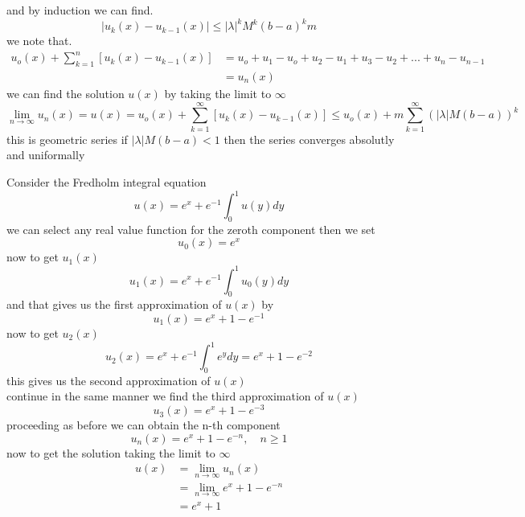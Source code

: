 \documentclass[]{article}
\begin{document}
and by induction we can find.
\[
    |u_{k}(x) - u_{k-1}(x)| \leq |\lambda|^kM^k {(b-a)}^k m    
\]
we note that.
\begin{align*}
u_o(x) + \sum_{k=1}^{n} [u_{k}(x) - u_{k-1}(x)] &= u_o + u_1 - u_o + u_2 - u_1 + u_3 - u_2 + ...+u_n - u_{n-1}
\\
&= u_n(x)
\end{align*}
we can find the solution $u(x)$ by taking the limit to $\infty$
\[
    \lim_{n\to\infty} u_n(x) = u(x) = u_o(x) + \sum_{k=1}^{\infty} [u_{k}(x) - u_{k-1}(x)] \leq u_o(x) + m\sum_{k=1}^{\infty} {(|\lambda|M(b-a))}^k    
\]
this is geometric series
if $|\lambda|M(b-a) < 1$ then the series converges absolutly and uniformally
\begin{example}
    Consider the Fredholm integral equation 
    \[
        u(x) = e^x + e^{-1}\int_{0}^{1}u(y)dy    
    \]
    we can select any real value function for the zeroth component then we set 
    \[
    u_0(x) = e^x 
    \]
    now to get $u_1(x)$
    \[
        u_1(x) = e^x + e^{-1}\int_{0}^{1}u_0(y)dy        
    \]
    and that gives us the first approximation of $u(x)$ by
    \[
        u_1(x) = e^x + 1 - e^{-1} 
    \]
    now to get $u_2(x)$
    \[
        u_2(x) = e^x + e^{-1}\int_{0}^{1}e^ydy = e^x + 1 - e^{-2}
    \]
    this gives us the second approximation of $u(x)$
    \\
    continue in the same manner we find the third approximation of $u(x)$
    \[
        u_3(x) = e^x + 1 - e^{-3}
    \]
    proceeding as before we can obtain the n-th component
    \[
        u_n(x) = e^x + 1 - e^{-n} , \quad n \geq 1
    \]
    now to get the solution taking the limit to $\infty$
    \begin{align*}
        u(x) &= \lim_{n\to\infty} u_n(x)
        \\
        &= \lim_{n\to\infty} e^x + 1 - e^{-n}
        \\
        &= e^x + 1
    \end{align*}
\end{example}
\end{document}
